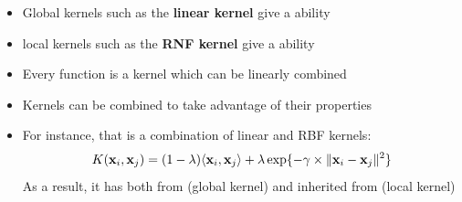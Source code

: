 \documentclass{tron}
\begin{document}
\begin{definition}{}
\begin{example}{}
	\end{example}
	
	\begin{remark}{}
		\begin{itemize}
			\item Global kernels such as the \textbf{linear kernel} give a  ability 
			\item local kernels such as the \textbf{RNF kernel} give a  ability
			\item Every  function is a kernel which can be linearly combined
			\item Kernels can be combined to take advantage of their properties
			\item For instance,  that is a combination of linear and RBF kernels:
			\begin{equation}
				K(\mathbf{x}_i, \mathbf{x}_j) = (1-\lambda)\langle \mathbf{x}_i, \mathbf{x}_j \rangle + \lambda \exp \{ -\gamma \times \| \mathbf{x}_i - \mathbf{x}_j \|^2 \}
			\end{equation}
			 As a result, it has both  from  (global kernel) and  inherited from  (local kernel)
		\end{itemize}
	\end{remark}
\end{definition}

\end{document}
